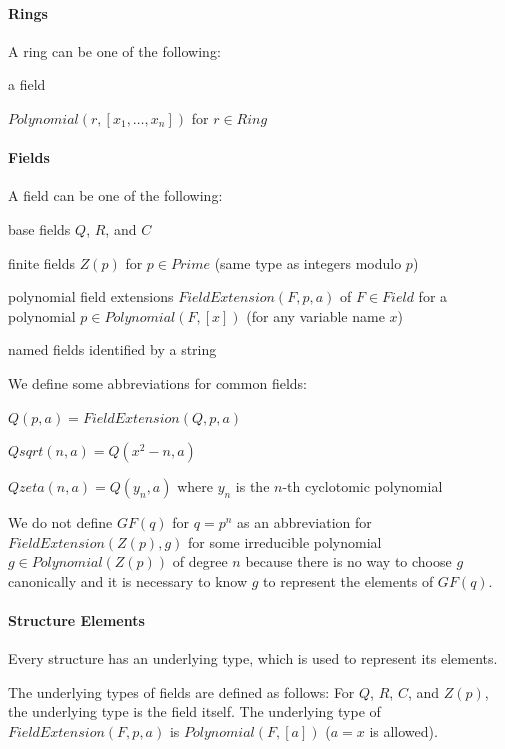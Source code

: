 \paragraph{Rings}
A ring can be one of the following:
\begin{compactitem}
 \item a field
 \item $Polynomial(r,[x_1,\ldots,x_n])$ for $r\in Ring$
\end{compactitem}

\paragraph{Fields}
A field can be one of the following:
\begin{compactitem}
 \item base fields $Q$, $R$, and $C$
 \item finite fields $Z(p)$ for $p\in Prime$ (same type as integers modulo $p$)
 \item polynomial field extensions $FieldExtension(F,p,a)$ of $F\in Field$ for a polynomial $p\in Polynomial(F,[x])$ (for any variable name $x$)
 \item named fields identified by a string
\end{compactitem}

We define some abbreviations for common fields:
\begin{compactitem}
 \item $Q(p,a)=FieldExtension(Q,p,a)$
 \item $Qsqrt(n,a)=Q(x^2-n,a)$
 \item $Qzeta(n,a)=Q(y_n,a)$ where $y_n$ is the $n$-th cyclotomic polynomial
\end{compactitem}

We do not define $GF(q)$ for $q=p^n$ as an abbreviation for $FieldExtension(Z(p),g)$ for some irreducible polynomial $g\in Polynomial(Z(p))$ of degree $n$ because there is no way to choose $g$ canonically and it is necessary to know $g$ to represent the elements of $GF(q)$.

\paragraph{Structure Elements}
Every structure has an underlying type, which is used to represent its elements.

The underlying types of fields are defined as follows:
For $Q$, $R$, $C$, and $Z(p)$, the underlying type is the field itself.
The underlying type of $FieldExtension(F,p,a)$ is $Polynomial(F,[a])$ ($a=x$ is allowed).

